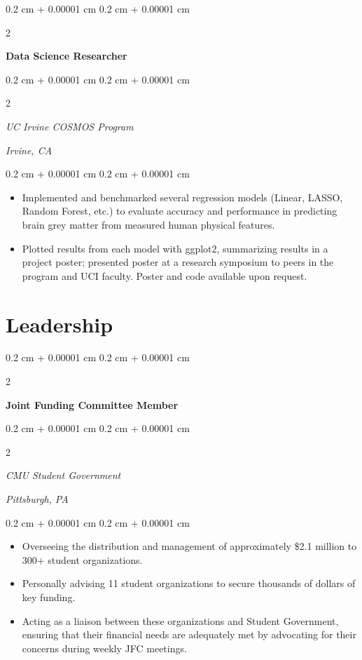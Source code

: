 \documentclass[10pt, letterpaper]{article}
\newenvironment{highlights}{
    \begin{itemize}[
        topsep=0.10 cm,
        parsep=0.10 cm,
        partopsep=0pt,
        itemsep=0pt,
        leftmargin=0.4 cm + 10pt
    ]
}{
    \end{itemize}
} %
\newenvironment{onecolentry}{
    \begin{adjustwidth}{
        0.2 cm + 0.00001 cm
    }{
        0.2 cm + 0.00001 cm
    }
}{
    \end{adjustwidth}
} %
\newenvironment{twocolentry}[2][]{
    \onecolentry
    \def\secondColumn{#2}
    \setcolumnwidth{\fill, 4.5 cm}
    \begin{paracol}{2}
}{
    \switchcolumn \raggedleft \secondColumn
    \end{paracol}
    \endonecolentry
} %
\begin{document}
        \vspace{0.2 cm}
        
        \begin{twocolentry}{
        }
            \textbf{Data Science Researcher}
        \end{twocolentry}
        \begin{twocolentry}{
            \textit{Irvine, CA}}
            \textit{UC Irvine COSMOS Program}
        \end{twocolentry}

        \vspace{0.10 cm}
        \begin{onecolentry}
            \begin{highlights}
                \item Implemented and benchmarked several regression models (Linear, LASSO, Random Forest, etc.) to evaluate accuracy and performance in predicting brain grey matter from measured human physical features.
                \item Plotted results from each model with ggplot2, summarizing results in a project poster; presented poster at a research symposium to peers in the program and UCI faculty.  Poster and code available upon request.
            \end{highlights}
        \end{onecolentry}

    \section{Leadership}
        \begin{twocolentry}{
            }
            \textbf{Joint Funding Committee Member}
        \end{twocolentry}
        \begin{twocolentry}{
            \textit{Pittsburgh, PA}}
            \textit{CMU Student Government}
        \end{twocolentry}

        \vspace{0.10 cm}
        \begin{onecolentry}
            \begin{highlights}
                \item Overseeing the distribution and management of approximately \$2.1 million to 300+ student organizations.
                \item Personally advising 11 student organizations to secure thousands of dollars of key funding.
                \item Acting as a liaison between these organizations and Student Government, ensuring that their financial needs are adequately met by advocating for their concerns during weekly JFC meetings.
            \end{highlights}
        \end{onecolentry}
\end{document}
